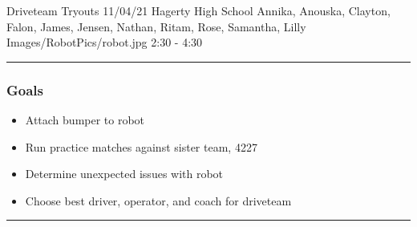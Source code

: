 \insertmeeting 
	{Driveteam Tryouts} 
	{11/04/21}
	{Hagerty High School}
	{Annika, Anouska, Clayton, Falon, James, Jensen, Nathan, Ritam, Rose, Samantha, Lilly}
	{Images/RobotPics/robot.jpg}
	{2:30 - 4:30}
	
\noindent\hfil\rule{\textwidth}{.4pt}\hfil
\subsubsection*{Goals}
\begin{itemize}
    \item Attach bumper to robot
    \item Run practice matches against sister team, 4227
    \item Determine unexpected issues with robot
    \item Choose best driver, operator, and coach for driveteam  

\end{itemize} 

\noindent\hfil\rule{\textwidth}{.4pt}\hfil

